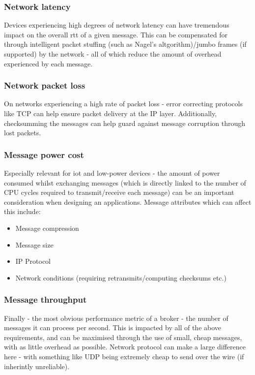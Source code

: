 \subsubsection{Network latency}
\label{subs:Network latency}

Devices experiencing high degrees of network latency can have tremendous impact
on the overall \gls{rtt} of a given message. This can be compensated for through
intelligent packet stuffing (such as Nagel's altgorithm)/jumbo frames (if supported)
by the network - all of which reduce the amount of overhead experienced by each
message.

\subsubsection{Network packet loss}
\label{subs:Network packet loss}

On networks experiencing a high rate of packet loss - error correcting protocols
like TCP can help ensure packet delivery at the IP layer. Additionally,
checksumming the messages can help guard against message corruption through lost
packets.

\subsubsection{Message power cost}
\label{subs:Message power cost}

Especially relevant for \gls{iot} and low-power devices - the amount of power
consumed whilst exchanging messages (which is directly linked to the number of
CPU cycles required to transmit/receive each message) can be an important
consideration when designing an applications. Message attributes which can
affect this include:

\begin{itemize}
  \item Message compression
  \item Message size
  \item IP Protocol
  \item Network conditions (requiring retransmits/computing checksums etc.)
\end{itemize}

\subsubsection{Message throughput}
\label{subs:Message throughput}

Finally - the most obvious performance metric of a broker - the number of messages
it can process per second. This is impacted by all of the above requirements,
and can be maximised through the use of small, cheap messages, with as little
overhead as possible. Network protocol can make a large difference here - with
something like UDP being extremely cheap to send over the wire
(if inherintly unreliable).

